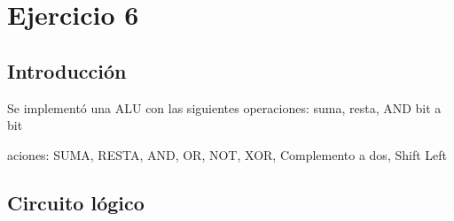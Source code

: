 \section{Ejercicio 6}
\subsection{Introducción}

Se implementó una ALU con las siguientes operaciones: suma, resta, AND bit a bit


aciones: SUMA, RESTA, AND, OR, NOT, XOR, Complemento a dos, Shift Left
\subsection{Circuito lógico}
